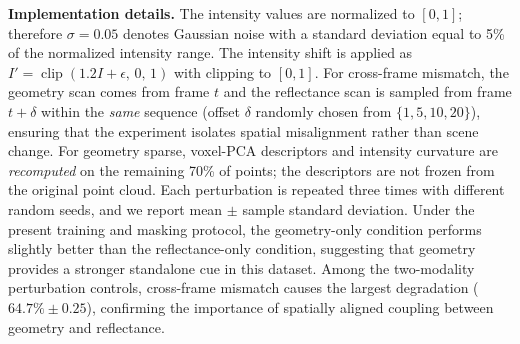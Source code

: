 \textbf{Implementation details.}
The intensity values are normalized to $[0,1]$; therefore
$\sigma=0.05$ denotes Gaussian noise with a standard deviation equal to
5\% of the normalized intensity range. The intensity shift is applied as
$I'=\operatorname{clip}(1.2I+\epsilon,\,0,\,1)$ with clipping to
$[0,1]$. For cross-frame mismatch, the geometry scan comes from frame
$t$ and the reflectance scan is sampled from frame $t+\delta$ within the
\emph{same} sequence (offset $\delta$ randomly chosen from
$\{1,5,10,20\}$), ensuring that the experiment isolates spatial
misalignment rather than scene change. For geometry sparse, voxel-PCA
descriptors and intensity curvature are \emph{recomputed} on the
remaining 70\% of points; the descriptors are not frozen from the
original point cloud. Each perturbation is repeated three times with
different random seeds, and we report mean $\pm$ sample standard
deviation. Under the present training and masking protocol, the
geometry-only condition performs slightly better than the
reflectance-only condition, suggesting that geometry provides a
stronger standalone cue in this dataset. Among the two-modality
perturbation controls, cross-frame mismatch causes the largest
degradation ($64.7\%\pm0.25$), confirming the importance of
spatially aligned coupling between geometry and reflectance.
